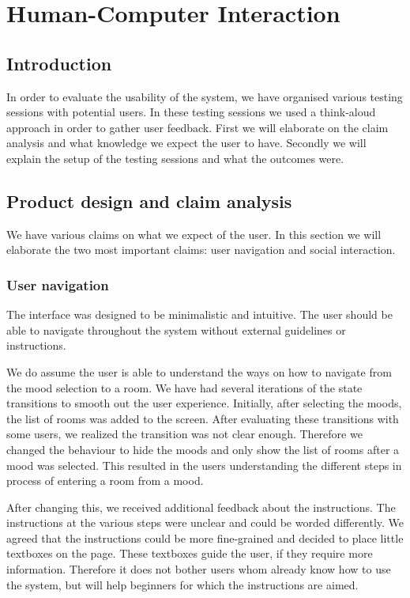 \chapter{Human-Computer Interaction}

\section{Introduction}
In order to evaluate the usability of the system, we have organised various testing sessions with potential users.
In these testing sessions we used a think-aloud approach in order to gather user feedback.
First we will elaborate on the claim analysis and what knowledge we expect the user to have.
Secondly we will explain the setup of the testing sessions and what the outcomes were.

\section{Product design and claim analysis}
We have various claims on what we expect of the user.
In this section we will elaborate the two most important claims: user navigation and social interaction.

\subsection{User navigation}

The interface was designed to be minimalistic and intuitive.
The user should be able to navigate throughout the system without external guidelines or instructions.

We do assume the user is able to understand the ways on how to navigate from the mood selection to a room.
We have had several iterations of the state transitions to smooth out the user experience.
Initially, after selecting the moods, the list of rooms was added to the screen.
After evaluating these transitions with some users, we realized the transition was not clear enough.
Therefore we changed the behaviour to hide the moods and only show the list of rooms after a mood was selected.
This resulted in the users understanding the different steps in process of entering a room from a mood.

After changing this, we received additional feedback about the instructions.
The instructions at the various steps were unclear and could be worded differently.
We agreed that the instructions could be more fine-grained and decided to place little textboxes on the page.
These textboxes guide the user, if they require more information.
Therefore it does not bother users whom already know how to use the system, but will help beginners for which the instructions are aimed.

